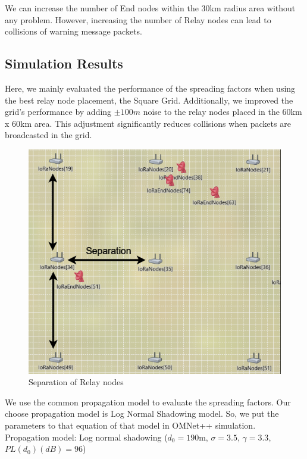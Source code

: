 We can increase the number of End nodes within the 30km radius area without any problem. However, increasing the number of Relay nodes can lead to collisions of warning message packets.

\subsection{Simulation Results}
\label{ch:system}

Here, we mainly evaluated the performance of the spreading factors when using the best relay node placement, the Square Grid. Additionally, we improved the grid's performance by adding $\pm{100m}$ noise to the relay nodes placed in the 60km x 60km area. This adjustment significantly reduces collisions when packets are broadcasted in the grid.


\begin{figure}[ht!]
    \centering
    \includegraphics[width=0.6\linewidth]{images/Separation.png}
    \caption{Separation of Relay nodes}
    \label{fig:enter-label}
\end{figure}

\newpage
We use the common propagation model to evaluate the spreading factors. Our choose propagation model is Log Normal Shadowing model. So, we put the parameters to that equation of that model in OMNet++ simulation. \\

\noindent Propagation model: Log normal shadowing ($d_0=190$m, $\sigma=3.5$, $\gamma=3.3$, $PL(d_0)(dB)=96$)



